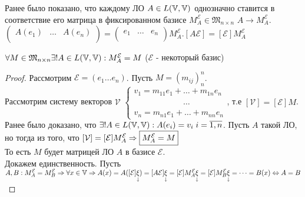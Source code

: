 \documentclass[../main.tex]{subfiles}
\begin{document}
Ранее было показано, что каждому ЛО $A \in L(\V,\V)$ однозначно ставится в соответствие его матрица в фиксированном базисе $M_{A}^{\mathcal{E}}\in \mathfrak{M}_{n \times n}$ $A\to M_{A}^{\mathcal{E}}$. $\begin{pmatrix}
    A(e_{1}) & \dots & A(e_{n}) \\
\end{pmatrix}= \begin{pmatrix}
    e_{1} & \dots & e_{n} \\
\end{pmatrix} M_{A}^{\mathcal{E}}. [A\mathcal{E}]=[\mathcal{E}]M_{A}^{\mathcal E}$
 \begin{theorem}
    $\forall M \in \mathfrak{M}_{n\times n} \exists ! A \in L(\V,\V): M_{A}^{\mathcal{E}}=M$ ($\mathcal{E}$ - некоторый базис)
 \end{theorem}
\begin{proof}
    Рассмотрим $\mathcal{E}=(e_{1}\dots e_{n})$. Пусть $M = (m_{ij})^{n}_{n}$.
    \\ Рассмотрим систему векторов $\mathcal{V}$
    $\begin{cases}
        v_{1} = m_{11}e_{1} + \dots + m_{1n}e_{n} \\
        \phantom{v_{1}=m_{11}e_{1}+}\dots \\ 
        v_{n} = m_{n1}e_{1} + \dots + m_{nn}e_{n}
    \end{cases}$, т.е $[\mathcal{V}]= [\mathcal{E}]M$. Ранее было доказано, что $\exists ! A \in L(\V,\V): A (e_{i})= v_{i}\; i=\overline{1,n}$. Пусть $A $ такой ЛО, но тогда из того, что $[\mathcal{V}]=[\mathcal{E}]M_{A}^{\mathcal{E}}\implies \fbox{$M_{A}^{\mathcal{E}}=M$}$\\ То есть $M$ будет  матрицей ЛО $A$ в базисе $\mathcal{E}$. 
    \\Докажем единственность. Пусть $A, B : M_{A}^{\mathcal{E}}=M_{B}^{\mathcal{E}}\implies \forall x \in \V \implies A(x)=A([\mathcal{E}]\underset{\downarrow}{\xi})= [A\mathcal{E}]\underset{\downarrow}{\xi}= [\mathcal{E}]M_{A}^{\mathcal{E}}\underset{\downarrow}{\xi}= [\mathcal{E}]M_{B}^{\mathcal{E}}\underset{\downarrow}{\xi}= \dots = B(x) \Leftrightarrow A=B$ 
\end{proof}
\end{document}
